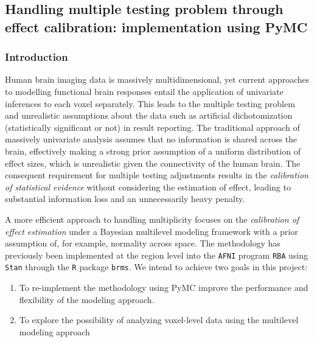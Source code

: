\documentclass[../main.tex]{subfiles}
\begin{document}
\subsection{Handling multiple testing problem through effect calibration: implementation using PyMC}\label{sec:pymc}


\subsubsection{Introduction}

Human brain imaging data is massively multidimensional, yet current approaches to modelling functional brain responses entail the application of univariate inferences to each voxel separately. This leads to the multiple testing problem and unrealistic assumptions about the data such as artificial dichotomization (statistically significant or not) in result reporting. The traditional approach of massively univariate analysis assumes that no information is shared across the brain, effectively making a strong prior assumption of a uniform distribution of effect sizes, which is unrealistic given the connectivity of the human brain. The consequent requirement for multiple testing adjustments results in the \textit{calibration of statistical evidence} without considering the estimation of effect, leading to substantial information loss and an unnecessarily heavy penalty.

A more efficient approach to handling multiplicity focuses on the \textit{calibration of effect estimation} under a Bayesian multilevel modeling framework with a prior assumption of, for example, normality across space\cite{chenHandlingMultiplicityNeuroimaging2019}. The methodology has previously been implemented at the region level into the \texttt{AFNI} program \texttt{RBA}\cite{chen_sources_2022} using \texttt{Stan} through the \texttt{R} package \texttt{brms}\cite{burknerBrmsPackageBayesian2017}. We intend to achieve two goals in this project: 
\begin{enumerate}[label=(\roman*),nolistsep]
    \item To re-implement the methodology using PyMC improve the performance and flexibility of the modeling approach.
    \item To explore the possibility of analyzing voxel-level data using the multilevel modeling approach
\end{enumerate}
\end{document}
